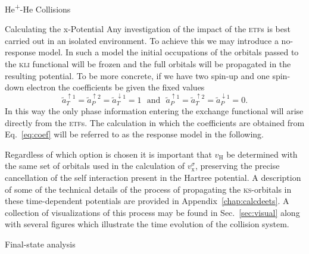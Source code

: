 \documentclass[a5paper, 9 pt]{extreport}
\begin{document}
\begin{chapter}{\texorpdfstring{He\textsuperscript{+}}{He+}-He Collisions \label{chap:hephe}}
\begin{section}{Calculating the x-Potential \label{sec:pot}}
      Any investigation of the impact of the \textsc{etf}s is best carried out in an isolated
      environment. To achieve this we may introduce a no-response model. In such a model the initial
      occupations of the orbitals passed to the \textsc{kli} functional will be frozen and the full
      orbitals will be propagated in the resulting potential. To be more concrete, if we have two
      spin-up and one spin-down electron the coefficients be given the fixed values
      \begin{equation} \label{eq:noresp}
         \tilde{a}^{\uparrow 1}_T = \tilde{a}^{\uparrow 2}_P = \tilde{a}^{\downarrow 1}_T  = 1
         ~~~ \mbox{and} ~~~
         \tilde{a}^{\uparrow 1}_P = \tilde{a}^{\uparrow 2}_T = \tilde{a}^{\downarrow 1}_P  = 0.
      \end{equation}
      In this way the only phase information entering the exchange functional will arise directly from
      the \textsc{etf}s. The calculation in which the coefficients are obtained from Eq.~\eqref{eq:coef}
      will be referred to as the response model in the following.

      Regardless of which option is chosen it is important that $v_\mathrm{H}$ be determined with the
      same set of orbitals used in the calculation of $v_\mathrm{x}^\sigma$, preserving the precise
      cancellation of the self interaction present in the Hartree potential. A description of some of
      the technical details of the process of propagating the \textsc{ks}-orbitals in these
      time-dependent potentials are provided in Appendix~\ref{chap:calcdeets}. A collection of
      visualizations of this process may be found in Sec.~\ref{sec:visual} along with several figures
      which illustrate the time evolution of the collision system.

   \end{section}

   \begin{section}{Final-state analysis \label{sec:hephe-det}}


\end{section}
\end{chapter}
\end{document}
